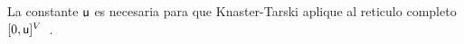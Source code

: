 La constante $\mathsf{u}$ es necesaria para que Knaster-Tarski aplique al reticulo completo $[0,\mathsf{u}]^V$~\cite{CastroDDP22}.



